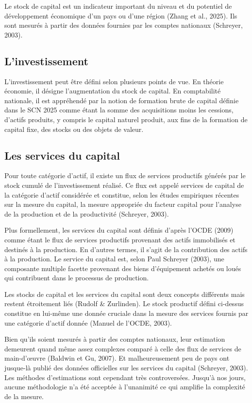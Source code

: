 \documentclass[12pt,a4paper,oneside]{report}
\begin{document}
Le stock de capital est un indicateur important du niveau et du potentiel de développement économique d’un
pays ou d’une région (Zhang et al., 2025). Ils sont mesurés à partir des données fournies par les comptes
nationaux (Schreyer, 2003).

\subsection{L’investissement}

L’investissement peut être défini selon plusieurs points de vue. En théorie économie, il désigne
l’augmentation du stock de capital. En comptabilité nationale, il est appréhendé par la notion de formation
brute de capital définie dans le SCN 2025 comme étant la somme des acquisitions moins les cessions, d’actifs
produits, y compris le capital naturel produit, aux fins de la formation de capital fixe, des stocks ou des
objets de valeur.

\subsection{Les services du capital}

Pour toute catégorie d’actif, il existe un flux de services productifs générés par le stock cumulé de
l’investissement réalisé. Ce flux est appelé services de capital de la catégorie d’actif considérée et
constitue, selon les études empiriques récentes sur la mesure du capital, la mesure appropriée du facteur
capital pour l’analyse de la production et de la productivité (Schreyer, 2003).

Plus formellement, les services du capital sont définis d’après l’OCDE (2009) comme étant le flux de services
productifs provenant des actifs immobilisés et destinés à la production. En d’autres termes, il s’agit de la
contribution des actifs à la production. Le service du capital est, selon Paul Schreyer (2003), une composante
multiple facette provenant des biens d’équipement achetés ou loués qui contribuent dans le processus de
production.

Les stocks de capital et les services du capital sont deux concepts différents mais restent étroitement liés
(Rudolf \& Zurlinden). Le stock productif défini ci-dessus constitue en lui-même une donnée cruciale dans la
mesure des services fournis par une catégorie d’actif donnée (Manuel de l’OCDE, 2003).

Bien qu’ils soient mesurés à partir des comptes nationaux, leur estimation demeurent quand même assez
complexes comparé à celle des flux de services de main-d’œuvre (Baldwin et Gu, 2007). Et malheureusement peu
de pays ont jusque-là publié des données officielles sur les services du capital (Schreyer, 2003). Les
méthodes d’estimations sont cependant très controversées. Jusqu’à nos jours, aucune méthodologie n’a été
acceptée à l’unanimité ce qui amplifie la complexité de la mesure.
\end{document}
